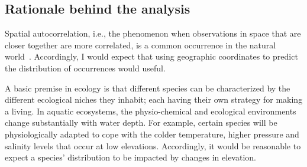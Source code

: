 \subsection{Rationale behind the analysis}

Spatial autocorrelation, i.e., the phenomenon when observations in space that are closer together are more correlated, is a common occurrence
in the natural world~\cite{spac_wiki}.
Accordingly, I would expect that using geographic coordinates to predict the distribution of occurrences would useful.

A basic premise in ecology is that different species can be characterized by the different ecological niches they inhabit;
each having their own strategy for making a living.
In aquatic ecosystems, the physio-chemical and ecological environments change substantially with water depth.
For example, certain species will be physiologically adapted to cope with the colder temperature, higher pressure and salinity levels that occur at
low elevations.
Accordingly, it would be reasonable to expect a species' distribution to be impacted by changes in elevation.

